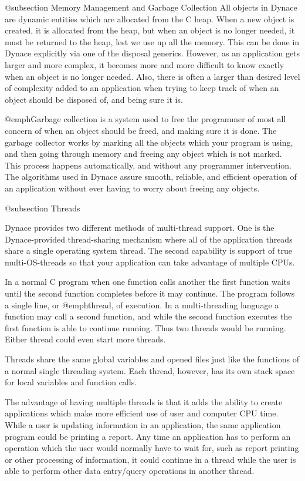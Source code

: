 @subsection Memory Management and Garbage Collection
All objects in Dynace are dynamic entities which are allocated from the C
heap.  When a new object is created, it is allocated from the heap, but
when an object is no longer needed, it must be returned to the heap,
lest we use up all the memory.  This can be done in Dynace explicitly via
one of the disposal generics.  However, as an application gets larger
and more complex, it becomes more and more difficult to know exactly
when an object is no longer needed.  Also, there is often a larger than
desired level of complexity added to an application when trying to keep
track of when an object should be disposed of, and being sure it is.

@emph{Garbage collection} is a system used to free the programmer of
most all concern of when an object should be freed, and making sure it
is done.  The garbage collector works by marking all the objects which
your program is using, and then going through memory and freeing any
object which is not marked.  This process happens automatically, and
without any programmer intervention.  The algorithms used in Dynace assure
smooth, reliable, and efficient operation of an application without
ever having to worry about freeing any objects.

@subsection Threads

Dynace provides two different methods of multi-thread support.  One is
the Dynace-provided thread-sharing mechanism where all of the
application threads share a single operating system thread.  The
second capability is support of true multi-OS-threads so that your
application can take advantage of multiple CPUs.

In a normal C program when one function calls another the first function
waits until the second function completes before it may continue.  The
program follows a single line, or @emph{thread}, of execution.  In a
multi-threading language a function may call a second function, and
while the second function executes the first function is able to continue
running.  Thus two threads would be running.  Either thread could even
start more threads.

Threads share the same global variables and opened files just like the
functions of a normal single threading system.  Each thread, however,
has its own stack space for local variables and function calls.

The advantage of having multiple threads is that it adds the ability to
create applications which make more efficient use of user and computer
CPU time.  While a user is updating information in an application, the
same application program could be printing a report.  Any time an
application has to perform an operation which the user would normally
have to wait for, such as report printing or other processing of
information, it could continue in a thread while the user is able to
perform other data entry/query operations in another thread.


